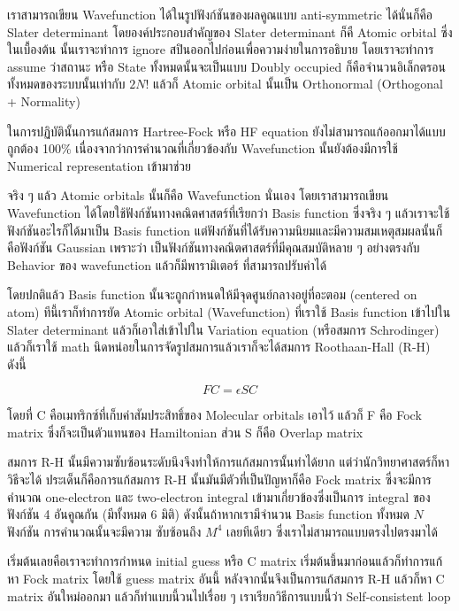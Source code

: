 เราสามารถเขียน Wavefunction ได้ในรูปฟังก์ชันของผลคูณแบบ anti-symmetric ได้นั่นก็คือ Slater 
determinant โดยองค์ประกอบสำคัญของ Slater determinant ก็คื Atomic orbital ซึ่งในเบื้องต้น%
นั้นเราจะทำการ ignore สปินออกไปก่อนเพื่อความง่ายในการอธิบาย โดยเราจะทำการ assume ว่าสถานะ
หรือ State ทั้งหมดนั้นจะเป็นแบบ Doubly occupied ก็คือจำนวนอิเล็กตรอนทั้งหมดของระบบนั้นเท่ากับ 
$2N!$ แล้วก็ Atomic orbital นั้นเป็น Orthonormal (Orthogonal + Normality) 

ในการปฏิบัตินั้นการแก้สมการ Hartree-Fock หรือ HF equation ยังไม่สามารถแก้ออกมาได้แบบถูกต้อง 
100\% เนื่องจากว่าการคำนวณที่เกี่ยวข้องกับ Wavefunction นั้นยังต้องมีการใช้ Numerical representation 
เข้ามาช่วย 

จริง ๆ แล้ว Atomic orbitals นั้นก็คือ Wavefunction นั่นเอง โดยเราสามารถเขียน Wavefunction 
ได้โดยใช้ฟังก์ชันทางคณิตศาสตร์ที่เรียกว่า Basis function ซึ่งจริง ๆ แล้วเราจะใช้ฟังก์ชันอะไรก็ได้มาเป็น 
Basis function แต่ฟังก์ชันที่ได้รับความนิยมและมีความสมเหตุสมผลนั้นก็คือฟังก์ชัน Gaussian เพราะว่า%
เป็นฟังก์ชันทางคณิตศาสตร์ที่มีคุณสมบัติหลาย ๆ อย่างตรงกับ Behavior ของ wavefunction แล้วก็มีพารามิเตอร์%
ที่สามารถปรับค่าได้

โดยปกติแล้ว Basis function นั้นจะถูกกำหนดให้มีจุดศูนย์กลางอยู่ที่อะตอม (centered on atom) 
ทีนี้เราก็ทำการยัด Atomic orbital (Wavefunction) ที่เราใช้ Basis function เข้าไปใน Slater 
determinant แล้วก็เอาใส่เข้าไปใน Variation equation (หรือสมการ Schrodinger) 
แล้วก็เราใช้ math นิดหน่อยในการจัดรูปสมการแล้วเราก็จะได้สมการ Roothaan-Hall (R-H) ดังนี้ 

\begin{equation}
    FC = \epsilon SC
\end{equation}

โดยที่ C คือเมทริกซ์ที่เก็บค่าสัมประสิทธิ์ของ Molecular orbitals เอาไว้ แล้วก็ F คือ Fock matrix 
ซึ่งก็จะเป็นตัวแทนของ Hamiltonian ส่วน S ก็คือ Overlap matrix 

สมการ R-H นั้นมีความซับซ้อนระดับนึงจึงทำให้การแก้สมการนั้นทำได้ยาก แต่ว่านักวิทยาศาสตร์ก็หาวิธีจะได้ 
ประเด็นก็คือการแก้สมการ R-H นั้นมันมีตัวที่เป็นปัญหาก็คือ Fock matrix ซึ่งจะมีการคำนวณ one-electron 
และ two-electron integral เข้ามาเกี่ยวข้องซึ่งเป็นการ integral ของฟังก์ชัน 4 อันคูณกัน
(มีทั้งหมด 6 มิติ) ดังนั้นถ้าหากเรามีจำนวน Basis function ทั้งหมด $N$ ฟังก์ชัน การคำนวณนั้นจะมีความ%
ซับซ้อนถึง $M^{4}$ เลยทีเดียว ซึ่งเราไม่สามารถแบบตรงไปตรงมาได้ 

เริ่มต้นเลยคือเราจะทำการกำหนด initial guess หรือ C matrix เริ่มต้นขึ้นมาก่อนแล้วก็ทำการแก้หา 
Fock matrix โดยใช้ guess matrix อันนี้ หลังจากนั้นจึงเป็นการแก้สมการ R-H แล้วก็หา C matrix 
อันใหม่ออกมา แล้วก็ทำแบบนี้วนไปเรื่อย ๆ เราเรียกวิธีการแบบนี้ว่า Self-consistent loop

